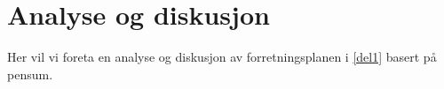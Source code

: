 \chapter{Analyse og diskusjon}

Her vil vi foreta en analyse og diskusjon av forretningsplanen i \ref{del1}
basert på pensum.
